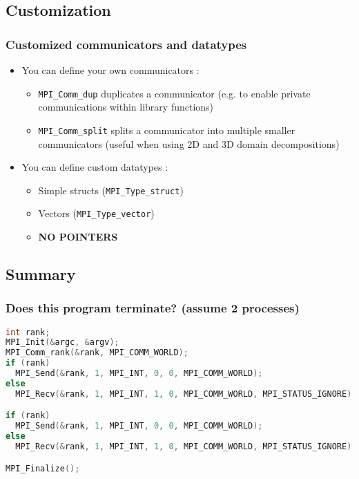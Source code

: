 \subsection{Customization}


\begin{frame}[containsverbatim]
\frametitle{Customized communicators and datatypes}

\begin{itemize}
	\item{ You can define your own communicators : 
	\begin{itemize}
		\item{\verb+MPI_Comm_dup+ duplicates a communicator (e.g. to enable private communications within library functions)}
		\item{\verb+MPI_Comm_split+ splits a communicator into multiple smaller communicators (useful when using 2D and 3D domain decompositions) }
	\end{itemize}
	}
	\item{ You can define custom datatypes :
	\begin{itemize}
		\item{Simple structs (\verb+MPI_Type_struct+)}
		\item{Vectors (\verb+MPI_Type_vector+)}
		\item{{\bf NO POINTERS}}
	\end{itemize}
	}
\end{itemize}

\end{frame}

\subsection{Summary}

\begin{frame}[containsverbatim]
\frametitle{Does this program terminate? (assume 2 processes)}
\begin{lstlisting}[language=C,frame=lines]
int rank;
MPI_Init(&argc, &argv);
MPI_Comm_rank(&rank, MPI_COMM_WORLD);
if (rank)
  MPI_Send(&rank, 1, MPI_INT, 0, 0, MPI_COMM_WORLD);
else
  MPI_Recv(&rank, 1, MPI_INT, 1, 0, MPI_COMM_WORLD, MPI_STATUS_IGNORE);

if (rank)
  MPI_Send(&rank, 1, MPI_INT, 0, 0, MPI_COMM_WORLD);
else
  MPI_Recv(&rank, 1, MPI_INT, 1, 0, MPI_COMM_WORLD, MPI_STATUS_IGNORE);

MPI_Finalize();
\end{lstlisting}
\end{frame}

